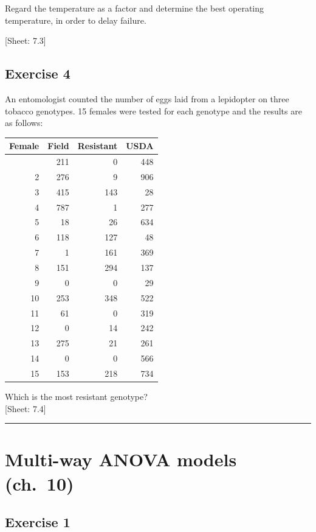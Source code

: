 \documentclass[a4paper,12pt,oneside]{book}
\begin{document}
Regard the temperature as a factor and determine the best operating temperature, in order to delay failure.

{[}Sheet: 7.3{]}

\hypertarget{exercise-4-3}{%
\subsection{Exercise 4}\label{exercise-4-3}}

An entomologist counted the number of eggs laid from a lepidopter on three tobacco genotypes. 15 females were tested for each genotype and the results are as follows:

\begin{longtable}[]{@{}rrrr@{}}
\toprule\noalign{}
Female & Field & Resistant & USDA \\
\midrule\noalign{}
\endhead
\bottomrule\noalign{}
\endlastfoot
1 & 211 & 0 & 448 \\
2 & 276 & 9 & 906 \\
3 & 415 & 143 & 28 \\
4 & 787 & 1 & 277 \\
5 & 18 & 26 & 634 \\
6 & 118 & 127 & 48 \\
7 & 1 & 161 & 369 \\
8 & 151 & 294 & 137 \\
9 & 0 & 0 & 29 \\
10 & 253 & 348 & 522 \\
11 & 61 & 0 & 319 \\
12 & 0 & 14 & 242 \\
13 & 275 & 21 & 261 \\
14 & 0 & 0 & 566 \\
15 & 153 & 218 & 734 \\
\end{longtable}

Which is the most resistant genotype?\\
{[}Sheet: 7.4{]}

\begin{center}\rule{0.5\linewidth}{0.5pt}\end{center}

\hypertarget{multi-way-anova-models-ch.-10}{%
\section{Multi-way ANOVA models (ch.~10)}\label{multi-way-anova-models-ch.-10}}

\hypertarget{exercise-1-6}{%
\subsection{Exercise 1}\label{exercise-1-6}}
\end{document}

